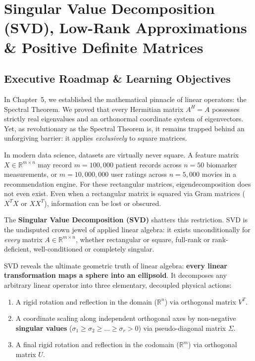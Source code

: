 \chapter[SVD \& Positive Definite Matrices]{Singular Value Decomposition (SVD), Low-Rank Approximations \& Positive Definite Matrices}
\label{chap:week06}

\section{Executive Roadmap \& Learning Objectives}

In Chapter~5, we established the mathematical pinnacle of linear operators: the Spectral Theorem. We proved that every Hermitian matrix $A^H = A$ possesses strictly real eigenvalues and an orthonormal coordinate system of eigenvectors. Yet, as revolutionary as the Spectral Theorem is, it remains trapped behind an unforgiving barrier: it applies \emph{exclusively} to square matrices.

In modern data science, datasets are virtually never square. A feature matrix $X \in \mathbb{R}^{m \times n}$ may record $m = 100{,}000$ patient records across $n = 50$ biomarker measurements, or $m = 10{,}000{,}000$ user ratings across $n = 5{,}000$ movies in a recommendation engine. For these rectangular matrices, eigendecomposition does not even exist. Even when a rectangular matrix is squared via Gram matrices ($X^T X$ or $X X^T$), information can be lost or obscured.

The \textbf{Singular Value Decomposition (SVD)} shatters this restriction. SVD is the undisputed crown jewel of applied linear algebra: it exists unconditionally for \emph{every} matrix $A \in \mathbb{R}^{m \times n}$, whether rectangular or square, full-rank or rank-deficient, well-conditioned or completely singular.

SVD reveals the ultimate geometric truth of linear algebra: \textbf{every linear transformation maps a sphere into an ellipsoid}. It decomposes any arbitrary linear operator into three elementary, decoupled physical actions:
\begin{enumerate}
    \item A rigid rotation and reflection in the domain ($\mathbb{R}^n$) via orthogonal matrix $V^T$.
    \item A coordinate scaling along independent orthogonal axes by non-negative \textbf{singular values} ($\sigma_1 \ge \sigma_2 \ge \dots \ge \sigma_r > 0$) via pseudo-diagonal matrix $\Sigma$.
    \item A final rigid rotation and reflection in the codomain ($\mathbb{R}^m$) via orthogonal matrix $U$.
\end{enumerate}

